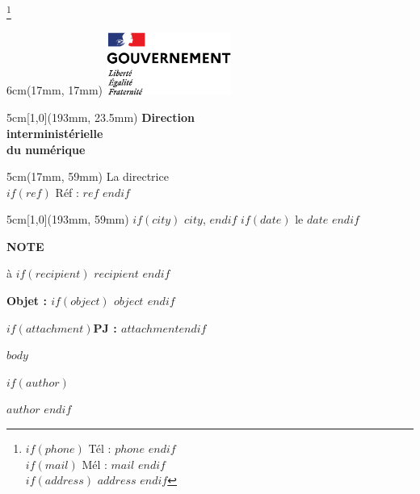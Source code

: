 \documentclass[10pt]{article}
\begin{document}
\let\thefootnote\relax\footnote{\scriptsize\color{Gray} $if(phone)$ Tél : $phone$ $endif$ \\
    $if(mail)$ Mél : $mail$ $endif$ \\
    $if(address)$ $address$ $endif$}

\begin{textblock*}{6cm}(17mm, 17mm)
\includegraphics[height=20.5mm, trim = 27mm 25mm 30mm 29mm, clip]{Gouvernement_RVB}
\end{textblock*}


\begin{textblock*}{5cm}[1,0](193mm, 23.5mm)
\large \raggedleft	\textbf{Direction \\ interministérielle \\ du numérique}
\end{textblock*}

\begin{textblock*}{5cm}(17mm, 59mm)
La directrice \\
$if(ref)$ \footnotesize Réf : $ref$ $endif$
\end{textblock*}


\begin{textblock*}{5cm}[1,0](193mm, 59mm)
\footnotesize \raggedleft $if(city)$ $city$, $endif$ $if(date)$ le $date$ $endif$
\end{textblock*}

\vspace*{50mm}

\begin{center}
\large\textbf{NOTE}
\end{center}

\begin{center}
\large à $if(recipient)$ $recipient$ $endif$
\end{center}

\vspace{30mm}
\textbf{Objet : $if(object)$ $object$ $endif$}

$if(attachment)$\textbf{PJ : $attachment$}$endif$
\vspace{5mm}

$body$

\bigskip

$if(author)$
\begin{flushright}
\textbf{$author$}
$endif$
\end{flushright}
\end{document}
